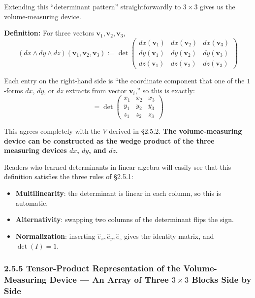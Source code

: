 \documentclass[a4paper,12pt,openany]{book}
\begin{document}
Extending this ``determinant pattern'' straightforwardly to
\(3 \times 3\) gives us the volume-measuring device.

\textbf{Definition:} For three vectors
\(\mathbf{v}_1, \mathbf{v}_2, \mathbf{v}_3\),
\[(dx \wedge dy \wedge dz)(\mathbf{v}_1, \mathbf{v}_2, \mathbf{v}_3) := \det\begin{pmatrix} dx(\mathbf{v}_1) & dx(\mathbf{v}_2) & dx(\mathbf{v}_3) \\ dy(\mathbf{v}_1) & dy(\mathbf{v}_2) & dy(\mathbf{v}_3) \\ dz(\mathbf{v}_1) & dz(\mathbf{v}_2) & dz(\mathbf{v}_3) \end{pmatrix}\]

Each entry on the right-hand side is ``the coordinate component that one
of the \(1\)-forms \(dx\), \(dy\), or \(dz\) extracts from vector
\(\mathbf{v}_i\),'' so this is exactly:
\[= \det\begin{pmatrix} x_1 & x_2 & x_3 \\ y_1 & y_2 & y_3 \\ z_1 & z_2 & z_3 \end{pmatrix}\]

This agrees completely with the \(V\) derived in §2.5.2. \textbf{The
volume-measuring device can be constructed as the wedge product of the
three measuring devices \(dx\), \(dy\), and \(dz\).}

Readers who learned determinants in linear algebra will easily see that
this definition satisfies the three rules of §2.5.1:

\begin{itemize}
\item
  \textbf{Multilinearity}: the determinant is linear in each column, so
  this is automatic.
\item
  \textbf{Alternativity}: swapping two columns of the determinant flips
  the sign.
\item
  \textbf{Normalization}: inserting \(\hat{e}_x, \hat{e}_y, \hat{e}_z\)
  gives the identity matrix, and \(\det(I) = 1\).
\end{itemize}

\hypertarget{tensor-product-representation-of-the-volume-measuring-device-an-array-of-three-3-times-3-blocks-side-by-side}{%
\subsubsection{\texorpdfstring{2.5.5 Tensor-Product Representation of
the Volume-Measuring Device — An Array of Three \(3 \times 3\) Blocks
Side by
Side}{2.5.5 Tensor-Product Representation of the Volume-Measuring Device — An Array of Three 3 \textbackslash times 3 Blocks Side by Side}}\label{tensor-product-representation-of-the-volume-measuring-device-an-array-of-three-3-times-3-blocks-side-by-side}}
\end{document}
